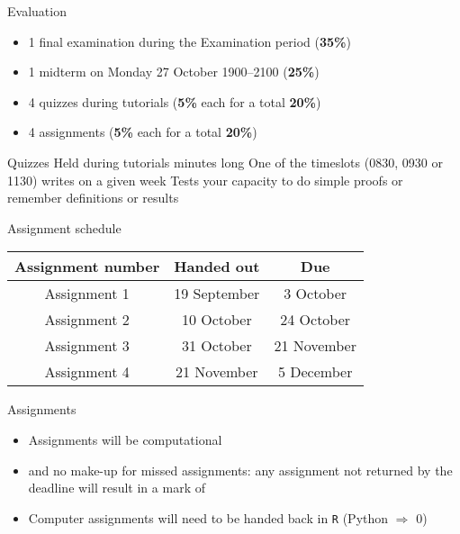 \documentclass[aspectratio=169]{beamer}\usepackage[]{graphicx}\usepackage[]{xcolor}
\begin{document}
\begin{frame}{Evaluation}
\begin{itemize}
\item 1 final examination during the Examination period (\textbf{35\%})
\vfill
\item 1 midterm on Monday 27 October 1900--2100 (\textbf{25\%})
\vfill
\item 4 quizzes during tutorials (\textbf{5\%} each for a total \textbf{20\%})
\vfill
\item 4 assignments (\textbf{5\%} each for a total \textbf{20\%})
\end{itemize}
\end{frame}

\begin{frame}{Quizzes}
\bbullet Held during tutorials
\vfill
{} minutes long 
\vfill
\bbullet One of the timeslots (0830, 0930 or 1130) writes on a given week
\vfill
\bbullet Tests your capacity to do simple proofs or remember definitions or results
\end{frame}

\begin{frame}{Assignment schedule}
\begin{center}
\begin{tabular}{ccc}
\toprule
Assignment number & Handed out & Due \\
\midrule
Assignment 1 & 19 September & 3 October \\
Assignment 2 & 10 October & 24 October\\
Assignment 3 & 31 October & 21 November \\
Assignment 4 & 21 November & 5 December \\
\bottomrule
\end{tabular}
\end{center}
\end{frame}

\begin{frame}{Assignments}
\begin{itemize}
\item Assignments will be computational
\vfill
\item {} and no make-up for missed assignments: any assignment not returned by the deadline will result in a mark of 
\vfill
\item Computer assignments will need to be handed back in \texttt{R} (Python $\Rightarrow$ 0)
\end{itemize}
\end{frame}
\end{document}

